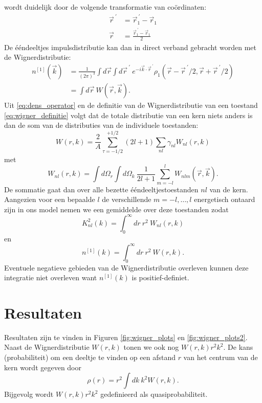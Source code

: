 \documentclass[11pt,twoside]{book}
\begin{document}
wordt duidelijk door de volgende transformatie van co\"{o}rdinaten:
\begin{align*}
\vec{r}^{\ \prime} & = \vec{r}^{\ \prime}_1-\vec{r}_1 \\
\vec{r} & = \frac{\vec{r}^{\ \prime}_1-\vec{r}_1}{2}
\end{align*}
De \'{e}\'{e}ndeeltjes impulsdistributie kan dan in direct verband gebracht worden met de Wignerdistributie:
\begin{align} \label{eq:voorwaarde}
n^{[1]}(\vec{k}) & =\frac{1}{(2\pi)^3}\int d\vec{r} \int d\vec{r}^{\ \prime}\  e^{-i\vec{k}\cdot\vec{r}^{\ \prime}}\rho_1(\vec{r}-\vec{r}^{\ \prime}/2,\vec{r}+\vec{r}^{\ \prime}/2) \nonumber \\
& = \int d\vec{r}\  W(\vec{r},\vec{k}).
\end{align}
Uit \eqref{eq:dens_operator} en de definitie van de Wignerdistributie van een toestand \eqref{eq:wigner_definitie} volgt dat de totale distributie van een kern niets anders is dan de som van de distributies van de individuele toestanden:
\begin{equation} \label{eq:wigner_magnitude}
 W(r,k) = \frac{2}{A}\sum_{\tau = -1/2}^{+1/2} (2l+1) \sum_{nl} \gamma_{nl} W_{nl}(r,k) 
\end{equation}
met 
\begin{equation} \label{eq:wigner_level}
W_{nl}(r,k) = \int d\Omega_r \int d\Omega_k\ \frac{1}{2l+1} \sum_{m= -l}^{l}W_{nlm}(\vec{r},\vec{k}).
\end{equation}
De sommatie gaat dan over alle bezette \'{e}\'{e}ndeeltjestoestanden $nl$ van de kern. Aangezien voor een bepaalde $l$ de verschillende $m  = -l, \ldots, l$ energetisch ontaard zijn in ons model nemen we een gemiddelde over deze toestanden zodat
\begin{equation}
K^{2}_{nl}(k) =   \int_0^\infty dr\ r^2\ W_{nl}(r,k)
\end{equation}
en
\begin{equation} \label{eq:voorwaarde_2}
n^{[1]}(k) =  \int_0^\infty dr\ r^2\  W(r,k).
\end{equation}
Eventuele negatieve gebieden van de Wignerdistributie overleven kunnen deze integratie niet overleven want $n^{[1]}(k)$ is positief-definiet. 
\section{Resultaten}



Resultaten zijn te vinden in Figuren \ref{fig:wigner_plots} en \ref{fig:wigner_plots2}. Naast de Wignerdistributie $W(r,k)$ tonen we ook nog $W(r,k)r^2 k^2$. De kans (probabiliteit) om een deeltje te vinden op een afstand $r$ van het centrum van de kern wordt gegeven door 
\begin{equation}
\rho (r) = r^2 \int dk\ k^2 W(r,k).
\end{equation}
Bijgevolg wordt $W(r,k)r^2 k^2$ gedefinieerd als quasiprobabiliteit.
\end{document}
